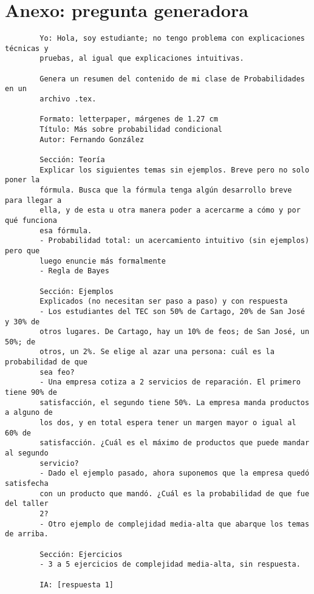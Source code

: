 \documentclass[letterpaper, 12pt]{article}
\begin{document}
	\section*{Anexo: pregunta generadora}
	\begin{verbatim}
		Yo: Hola, soy estudiante; no tengo problema con explicaciones técnicas y
		pruebas, al igual que explicaciones intuitivas.
		
		Genera un resumen del contenido de mi clase de Probabilidades en un
		archivo .tex.
		
		Formato: letterpaper, márgenes de 1.27 cm
		Título: Más sobre probabilidad condicional
		Autor: Fernando González
		
		Sección: Teoría
		Explicar los siguientes temas sin ejemplos. Breve pero no solo poner la
		fórmula. Busca que la fórmula tenga algún desarrollo breve para llegar a
		ella, y de esta u otra manera poder a acercarme a cómo y por qué funciona
		esa fórmula.
		- Probabilidad total: un acercamiento intuitivo (sin ejemplos) pero que
		luego enuncie más formalmente
		- Regla de Bayes
		
		Sección: Ejemplos
		Explicados (no necesitan ser paso a paso) y con respuesta
		- Los estudiantes del TEC son 50% de Cartago, 20% de San José y 30% de
		otros lugares. De Cartago, hay un 10% de feos; de San José, un 50%; de
		otros, un 2%. Se elige al azar una persona: cuál es la probabilidad de que
		sea feo?
		- Una empresa cotiza a 2 servicios de reparación. El primero tiene 90% de
		satisfacción, el segundo tiene 50%. La empresa manda productos a alguno de
		los dos, y en total espera tener un margen mayor o igual al 60% de
		satisfacción. ¿Cuál es el máximo de productos que puede mandar al segundo
		servicio?
		- Dado el ejemplo pasado, ahora suponemos que la empresa quedó satisfecha
		con un producto que mandó. ¿Cuál es la probabilidad de que fue del taller
		2?
		- Otro ejemplo de complejidad media-alta que abarque los temas de arriba.
				
		Sección: Ejercicios
		- 3 a 5 ejercicios de complejidad media-alta, sin respuesta.
		
		IA: [respuesta 1]
	\end{verbatim}
	
\end{document}
